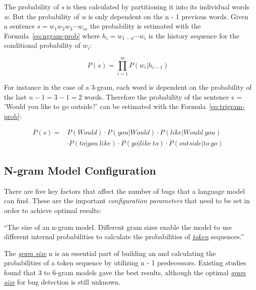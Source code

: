 The probability of \textit{s} is then calculated by partitioning it into its individual words \textit{w}. But the probability of \textit{w} is only dependent on the n - 1 previous words. Given a sentence \( s = w_1w_2w_3\cdots w_m \) the probability is estimated with the Formula~\ref{eq:ngram-prob} where \(h_i = w_{1-n}\cdots w_i \) is the history sequence for the conditional probability of \(w_i\):

\begin{equation} \label{eq:ngram-prob}
P(s) ={} \displaystyle\prod_{i=1}^{m} P(w_i|h_{i-1})
\end{equation}

For instance in the case of a 3-gram, each word is dependent on the probability of the last \(n - 1 = 3 - 1 = 2 \) words. Therefore the probability of the sentence s = 'Would you like to go outside?' can be estimated with the Formula~\ref{eq:trigram-prob}:

\begin{equation}\label{eq:trigram-prob}
\begin{aligned}
P(s) ={} & P(Would)\cdot P(you|Would)\cdot P(like|Would\ you) \\ 
		 & \cdot P(to|you\ like)\cdot P(go|like\ to)\cdot P(outside|to\ go)
\end{aligned}
\end{equation} 
  
\subsection{N-gram Model Configuration}\label{subsec:configuration}
There are five key factors that affect the number of bugs that a language model can find. These are the important \textit{configuration parameters} that need to be set in order to achieve optimal results:  

\begin{definition}\label{def:gram_size}
    ``The size of an n-gram model. Different gram sizes enable the model to use different internal probabilities to calculate the probabilities of \hyperref[def:token]{\textit{token}} sequences.''~\cite{bugram}
\end{definition}

The \hyperref[def:gram_size]{\textit{gram size}} n is an essential part of building an \ngram{} and calculating the probabilities of a token sequence by utilizing n - 1 predecessors. Existing studies found that 3 to 6-gram models gave the best results, although the optimal \hyperref[def:gram_size]{\textit{gram size}} for bug detection is still unknown. 

